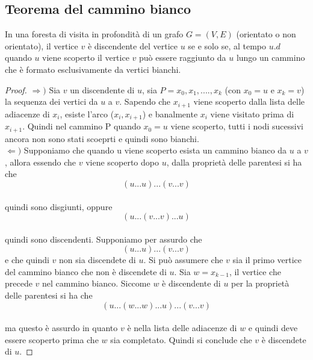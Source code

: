 \subsection{Teorema del cammino bianco}
\colorbox{SALZO}{\parbox{\dimexpr\linewidth-2\fboxsep}{\begin{theorem}
In una foresta di visita in profondità di un grafo $G = (V, E)$ (orientato o non orientato), il
vertice $v$ è discendente del vertice $u$ se e solo se, al tempo $u.d$ quando $u$ viene scoperto il vertice
$v$ può essere raggiunto da $u$ lungo un cammino che è formato esclusivamente da vertici bianchi.
\end{theorem}}}
\begin{proof}
    $\Rightarrow )$ Sia $v$ un discendente di $u$, sia $P=x_0, x_1,....,x_k$ (con $x_0=u$ e $x_k=v$) la sequenza 
    dei vertici da $u$ a $v$. Sapendo che $x_{i+1}$ viene scoperto dalla lista delle adiacenze di $x_i$, esiste 
    l'arco ($x_i, x_{i+1}$) e banalmente $x_i$ viene visitato prima di $x_{i+1}$. Quindi nel cammino P quando 
    $x_0 = u$ viene scoperto, tutti i nodi sucessivi ancora non sono stati scoeprti e quindi sono bianchi.\\
    $\Leftarrow )$ Supponiamo che quando u viene scoperto esista un cammino bianco da $u$ a $v$, allora essendo
    che $v$ viene scoperto dopo $u$, dalla proprietà delle parentesi si ha che\\
    $$(u...u)...(v...v)$$\\
    quindi sono disgiunti, oppure\\
    $$ (u...(v...v)...u)$$\\
    quindi sono discendenti.        
    Supponiamo per assurdo che\\
    $$(u...u)...(v...v)$$
    e che quindi $v$ non sia discendete di $u$. Si può assumere che $v$ sia il primo vertice del cammino
    bianco che non è discendete di $u$. Sia $w = x_{k-1}$, il vertice che precede $v$ nel cammino bianco.
    Siccome $w$ è discendente di $u$ per la proprietà delle parentesi si ha che\\
    $$(u...(w...w)...u)...(v...v)$$\\
    ma questo è assurdo in quanto $v$ è nella lista delle adiacenze di $w$ e quindi deve essere scoperto
    prima che $w$ sia completato. Quindi si conclude che $v$ è discendete di $u$.    
\end{proof}
